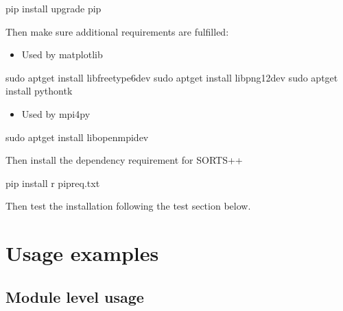 \documentclass[letterpaper,10pt,english]{sphinxmanual}
\begin{document}
%
\begin{sphinxVerbatim}[commandchars=\\\{\}]
pip install \PYGZhy{}\PYGZhy{}upgrade pip
\end{sphinxVerbatim}

Then make sure additional requirements are fulfilled:
\begin{itemize}
\item {} 
Used by matplotlib

\end{itemize}

%
\begin{sphinxVerbatim}[commandchars=\\\{\}]
sudo apt\PYGZhy{}get install libfreetype6\PYGZhy{}dev
sudo apt\PYGZhy{}get install libpng12\PYGZhy{}dev
sudo apt\PYGZhy{}get install python\PYGZhy{}tk
\end{sphinxVerbatim}
\begin{itemize}
\item {} 
Used by mpi4py

\end{itemize}

%
\begin{sphinxVerbatim}[commandchars=\\\{\}]
sudo apt\PYGZhy{}get install libopenmpi\PYGZhy{}dev
\end{sphinxVerbatim}

Then install the dependency requirement for SORTS++

%
\begin{sphinxVerbatim}[commandchars=\\\{\}]
pip install \PYGZhy{}r pip\PYGZus{}req.txt
\end{sphinxVerbatim}

Then test the installation following the test section below.


\chapter{Usage examples}
\label{\detokenize{usage_examples:usage-examples}}\label{\detokenize{usage_examples::doc}}

\section{Module level usage}
\label{\detokenize{usage_examples:module-level-usage}}
\end{document}
